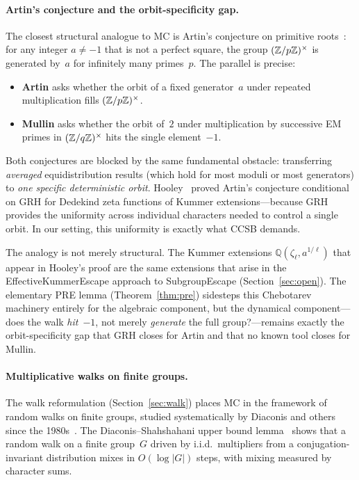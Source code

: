 \paragraph{Artin's conjecture and the orbit-specificity gap.}
The closest structural analogue to MC is Artin's conjecture on
primitive roots~\cite{Artin1927}: for any integer $a \neq -1$ that is not a
perfect square, the group $(\mathbb{Z}/p\mathbb{Z})^\times$ is generated by~$a$ for
infinitely many primes~$p$.  The parallel is precise:
\begin{itemize}[nosep]
\item \textbf{Artin} asks whether the orbit of a fixed generator~$a$
  under repeated multiplication fills $(\mathbb{Z}/p\mathbb{Z})^\times$.
\item \textbf{Mullin} asks whether the orbit of~$2$ under
  multiplication by successive EM primes in $(\mathbb{Z}/q\mathbb{Z})^\times$ hits
  the single element~$-1$.
\end{itemize}
Both conjectures are blocked by the same fundamental obstacle:
transferring \emph{averaged} equidistribution results (which hold for
most moduli or most generators) to \emph{one specific deterministic
orbit}.  Hooley~\cite{Hooley1967} proved Artin's conjecture conditional on GRH
for Dedekind zeta functions of Kummer extensions---because GRH
provides the uniformity across individual characters needed to control
a single orbit.  In our setting, this uniformity is exactly what CCSB
demands.

The analogy is not merely structural.  The Kummer extensions
$\mathbb{Q}(\zeta_\ell, a^{1/\ell})$ that appear in Hooley's proof
are the same extensions that arise in the EffectiveKummerEscape
approach to SubgroupEscape (Section~\ref{sec:open}).  The elementary
PRE lemma (Theorem~\ref{thm:pre}) sidesteps this Chebotarev machinery
entirely for the algebraic component, but the dynamical
component---does the walk \emph{hit}~$-1$, not merely \emph{generate}
the full group?---remains exactly the orbit-specificity gap that GRH
closes for Artin and that no known tool closes for Mullin.

\paragraph{Multiplicative walks on finite groups.}
The walk reformulation (Section~\ref{sec:walk}) places MC in the
framework of random walks on finite groups, studied systematically by
Diaconis and others since the
1980s~\cite{ChungDiaconisGraham1987}.  The Diaconis--Shahshahani upper
bound lemma~\cite{DiaconisShahshahani1981} shows that a random walk on a finite group~$G$
driven by i.i.d.\ multipliers from a conjugation-invariant
distribution mixes in $O(\log |G|)$ steps, with mixing measured by
character sums.

